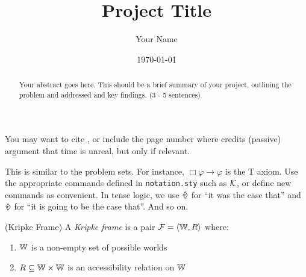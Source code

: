 \documentclass[11pt, a4paper]{article}  %
\title{Project Title}                                %
\author{Your Name}                                    %
\date{\today}                                         %
\begin{document}

\papertitle

\begin{abstract}
\noindent
  Your abstract goes here.
  This should be a brief summary of your project, outlining the problem and addressed and key findings.
  (3 - 5 sentences)
\end{abstract}
\vspace{20pt}




  \label{sec:intro}


You may want to cite \citet{Carnap1947}, or include the page number where \citet[p.~7]{Prior1967} credits  (passive) argument that time is unreal, but only if relevant.





  \label{sec:notation}


This is similar to the problem sets.
For instance, $\Box \varphi \rightarrow \varphi$ is the T axiom.
Use the appropriate commands defined in \texttt{notation.sty} such as $\mathcal{K}$, or define new commands as convenient.
In tense logic, we use $\past$ for ``it was the case that'' and $\future$ for ``it is going to be the case that''.
And so on.





  \label{sec:theorems}


\begin{Dthm}{(Kripke Frame)} \label{def:kripke}
  A \emph{Kripke frame} is a pair $\mathcal{F} = \langle\mathbb{W}, R\rangle$ where:
  \begin{enumerate}
    \item $\mathbb{W}$ is a non-empty set of possible worlds
    \item $R \subseteq \mathbb{W} \times \mathbb{W}$ is an accessibility relation on $\mathbb{W}$
  \end{enumerate}
\end{Dthm}
\end{document}
